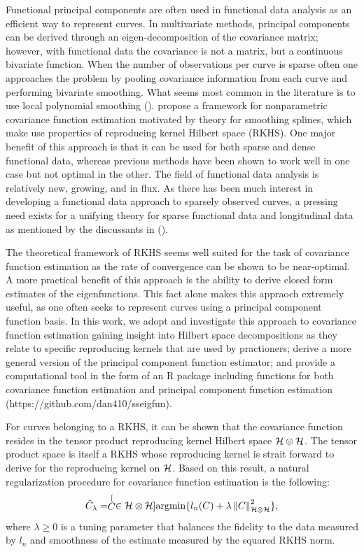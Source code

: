Functional principal components are often used in functional data analysis as an efficient way to represent curves. In multivariate methods, principal components can be derived through an eigen-decomposition of the covariance matrix; however, with functional data the covariance is not a matrix, but a continuous bivariate function. When the number of observations per curve is sparse often one approaches the problem by pooling covariance information from each curve and performing bivariate smoothing. What seems most common in the literature is to use local polynomial smoothing (\cite{Yao:2005cv}). \cite{Cai:2010vr} propose a framework for nonparametric covariance function estimation motivated by theory for smoothing splines, which make use properties of reproducing kernel Hilbert space (RKHS). One major benefit of this approach is that it can be used for both sparse and dense functional data, whereas previous methods have been shown to work well in one case but not optimal in the other. The field of functional data analysis is relatively new, growing, and in flux. As there has been much interest in developing a functional data approach to sparsely observed curves, a pressing need exists for a unifying theory for sparse functional data and longitudinal data as mentioned by the discussants in (\cite{guo2004discussion}). 

The theoretical framework of RKHS seems well suited for the task of covariance function estimation as the rate of convergence can be shown to be near-optimal. A more practical benefit of this approach is the ability to derive closed form estimates of the eigenfunctions. This fact alone makes this appraoch extremely useful, as one often seeks to represent curves using a principal component function basis. In this work, we adopt and investigate this approach to covariance function estimation gaining insight into Hilbert space decompositions as they relate to specific reproducing kernels that are used by practioners; derive a more general version of the principal component function estimator; and provide a computational tool in the form of an R package including functions for both covariance function estimation and principal component function estimation (https://github.com/dan410/sseigfun).

For curves belonging to a RKHS, it can be shown that the covariance function resides in the tensor product reproducing kernel Hilbert space $\mathcal{H}\otimes \mathcal{H}$. The tensor product space is itself a RKHS whose reproducing kernel is strait forward to derive for the reproducing kernel on $\mathcal{H}$. Based on this result, a natural regularization procedure for covariance function estimation is the following: 
\begin{equation}
	\label{eq:cy-cov-est} \hat{C}_{\lambda} = \stackrel[C \in \mathcal{H}\otimes\mathcal{H}]{}{\mbox{argmin}} \{l_{n}(C)+\lambda\left\Vert C\right\Vert _{\mathcal{H}\otimes \mathcal{H}}^{2}\}, 
\end{equation}
where $\lambda\geq0$ is a tuning parameter that balances the fidelity to the data measured by $l_{n}$ and smoothness of the estimate measured by the squared RKHS norm.

